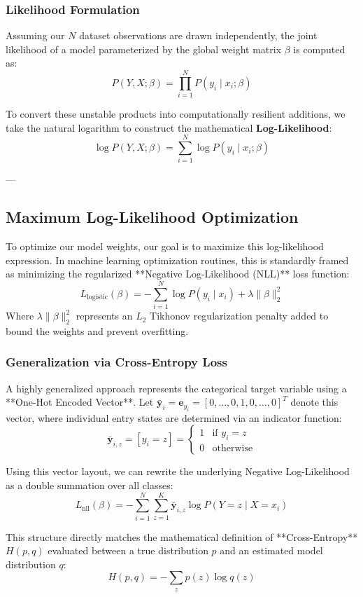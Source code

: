 \documentclass{article}
\begin{document}
\subsubsection{Likelihood Formulation}
Assuming our $N$ dataset observations are drawn independently, the joint likelihood of a model parameterized by the global weight matrix $\beta$ is computed as:
\[ P(Y, X; \beta) = \prod_{i=1}^{N} P(y_i \mid x_i; \beta) \]

To convert these unstable products into computationally resilient additions, we take the natural logarithm to construct the mathematical \textbf{Log-Likelihood}:
\[ \log P(Y, X; \beta) = \sum_{i=1}^{N} \log P(y_i \mid x_i; \beta) \]

---

\subsection{Maximum Log-Likelihood Optimization}
To optimize our model weights, our goal is to maximize this log-likelihood expression. In machine learning optimization routines, this is standardly framed as minimizing the regularized **Negative Log-Likelihood (NLL)** loss function:
\[ L_{\text{logistic}}(\beta) = -\sum_{i=1}^{N} \log P(y_i \mid x_i) + \lambda \|\beta\|_2^2 \]
Where $\lambda \|\beta\|_2^2$ represents an $L_2$ Tikhonov regularization penalty added to bound the weights and prevent overfitting.

\subsubsection{Generalization via Cross-Entropy Loss}
A highly generalized approach represents the categorical target variable using a **One-Hot Encoded Vector**. Let $\mathbf{\bar{y}}_i = \mathbf{e}_{y_i} = [0, \dots, 0, 1, 0, \dots, 0]^T$ denote this vector, where individual entry states are determined via an indicator function:
\[ \mathbf{\bar{y}}_{i,z} = [y_i = z] = \begin{cases} 1 & \text{if } y_i = z \\ 0 & \text{otherwise} \end{cases} \]

Using this vector layout, we can rewrite the underlying Negative Log-Likelihood as a double summation over all classes:
\[ L_{\text{nll}}(\beta) = -\sum_{i=1}^{N} \sum_{z=1}^{K} \mathbf{\bar{y}}_{i,z} \log P(Y = z \mid X = x_i) \]

This structure directly matches the mathematical definition of **Cross-Entropy** $H(p, q)$ evaluated between a true distribution $p$ and an estimated model distribution $q$:
\[ H(p, q) = -\sum_{z} p(z) \log q(z) \]
\end{document}
